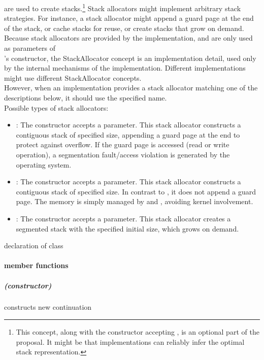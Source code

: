 \label{subsec:stackalloc}
are used to create stacks.\footnote{This concept, along with the \cont
constructor accepting , is an optional part of the
proposal. It might be that implementations can reliably infer the optimal
stack representation.} Stack allocators might implement arbitrary stack
strategies. For instance, a stack allocator might append a guard page at the
end of the stack, or cache stacks for reuse, or create stacks that grow on
demand.\\
Because stack allocators are provided by the implementation, and are only used
as parameters of\\
\cont's constructor, the StackAllocator concept is an implementation detail,
used only by the internal mechanisms of the \cont implementation. Different
implementations might use different StackAllocator concepts.\\
However, when an implementation provides a stack allocator matching one of
the descriptions below, it should use the specified name.\\
Possible types of stack allocators:
\begin{itemize}
    \item {}: The constructor accepts a 
        parameter. This stack allocator constructs a contiguous stack of
        specified size, appending a guard page at the end to protect against
        overflow. If the guard page is accessed (read or write operation), a
        segmentation fault/access violation is generated by the operating
        system.
    \item {}: The constructor accepts a  parameter.
        This stack allocator constructs a contiguous stack of specified size.
        In contrast to , it does not append a guard
        page. The memory is simply managed by 
        and , avoiding kernel involvement.
    \item {}: The constructor accepts a  parameter.
        This stack allocator creates a segmented stack with the specified
        initial size, which grows on demand.
\end{itemize}


declaration of class \cont
{}
\paragraph*{member functions}
\subparagraph*{(constructor)}
constructs new continuation\\

